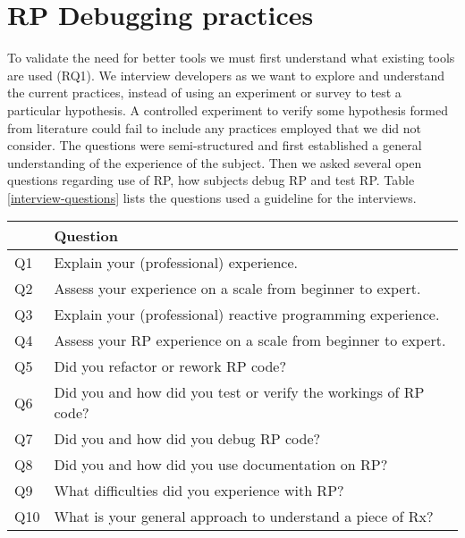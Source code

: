 \section{RP Debugging practices}
To validate the need for better tools we must first understand what existing tools are used (RQ1).
We interview developers as we want to explore and understand the current practices, instead of using an experiment or survey to test a particular hypothesis.
A controlled experiment to verify some hypothesis formed from literature could fail to include any practices employed that we did not consider.
The questions were semi-structured and first established a general understanding of the experience of the subject. 
Then we asked several open questions regarding use of RP, how subjects debug RP and test RP. Table \ref{interview-questions} lists the questions used a guideline for the interviews.

\begin{table*}[]
\centering
\caption{Interview questions}
\label{interview-questions}
\begin{tabular}{ll}
    & \textbf{Question}                                               \\ \hline
Q1  & Explain your (professional) experience.                         \\ \hline
Q2  & Assess your experience on a scale from beginner to expert.      \\ \hline
Q3  & Explain your (professional) reactive programming experience.    \\ \hline
Q4  & Assess your RP experience on a scale from beginner to expert.   \\ \hline
Q5  & Did you refactor or rework RP code?                             \\ \hline
Q6  & Did you and how did you test or verify the workings of RP code? \\ \hline
Q7  & Did you and how did you debug RP code?                          \\ \hline
Q8  & Did you and how did you use documentation on RP?                \\ \hline
Q9  & What difficulties did you experience with RP?                   \\ \hline
Q10 & What is your general approach to understand a piece of Rx?      \\ \hline
\end{tabular}
\end{table*}

